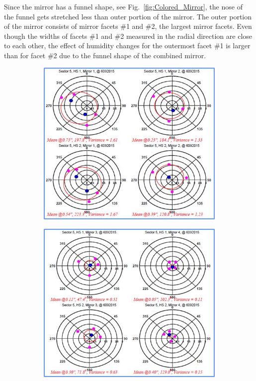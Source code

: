 Since the mirror has a funnel shape, see Fig.~\ref{fig:Colored_Mirror}, the nose of the funnel gets stretched
less than outer portion of the mirror. The outer portion of the mirror consists of mirror facets \#1 and \#2, the
largest mirror facets. Even though the widths of facets \#1 and \#2 measured in the radial direction are close to
each other, the effect of humidity changes for the outermost facet \#1 is larger than for facet \#2 due to the
funnel shape of the combined mirror.

\begin{figure}
\begin{subfigure}[b]{0.49\textwidth}
    \includegraphics[width=1.0\textwidth]{images/GEO_TEST_Sect5_M_1_M_2.jpg}
    \caption{} \label{fig:subfig1_a}
\end{subfigure}
\hspace*{\fill} %
\begin{subfigure}[b]{0.5\textwidth}
    \includegraphics[width=1.0\linewidth]{images/GEO_TEST_Sect5_M_3_M_4.jpg}

\end{subfigure}
\end{figure}
